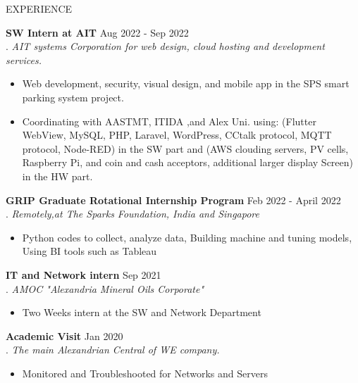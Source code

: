 \documentclass{resume} %
\begin{document}


 \begin{rSection}{EXPERIENCE}


 \textbf{SW Intern at AIT} \hfill  Aug 2022 - Sep 2022\\
  .	 \hfill \textit{AIT systems Corporation for web design, cloud hosting and development services.}
  \begin{itemize}
     \itemsep -3pt {} 
      \item Web development, security, visual design, and mobile app in the SPS smart parking system project.
      \item Coordinating with AASTMT, ITIDA ,and Alex Uni. using: (Flutter WebView, MySQL, PHP, Laravel, WordPress, CCtalk protocol, MQTT protocol, Node-RED) in the SW part and (AWS clouding servers, PV cells, Raspberry Pi, and coin and cash acceptors, additional larger display Screen) in the HW part.
 \end{itemize}


 \textbf{GRIP Graduate Rotational Internship Program} \hfill  Feb 2022 - April 2022\\
  .	 \hfill \textit{Remotely,at The Sparks Foundation, India and Singapore}
  \begin{itemize}
     \itemsep -3pt {} 
      \item Python codes to collect, analyze data, Building machine and tuning models, Using BI tools such as Tableau
 \end{itemize}
 
 
  \textbf{IT and Network intern} \hfill   Sep 2021\\
 . \hfill \textit{AMOC "Alexandria Mineral Oils Corporate"}
  \begin{itemize}
     \itemsep -3pt {} 
      \item Two Weeks intern at the SW and Network Department
 \end{itemize}
 
   \textbf{Academic Visit} \hfill   Jan 2020\\
. \hfill \textit{The main Alexandrian Central of WE company.}
  \begin{itemize}
     \itemsep -3pt {} 
      \item  Monitored and Troubleshooted for Networks and Servers
 \end{itemize}
 

\end{rSection}
\end{document}
